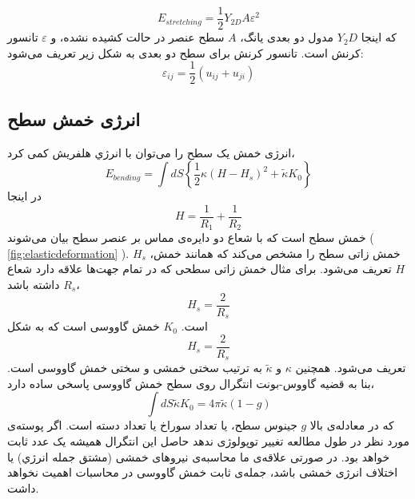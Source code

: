 \begin{equation}
E_{stretching}=\frac{1}{2}Y_{2D}A\varepsilon^2
\end{equation}
که اینجا 
$Y_2D$
مدول دو بعدی یانگ،
$A$
سطح عنصر در حالت کشیده نشده، و
$\varepsilon$
تانسور کرنش است. تانسور کرنش برای سطح دو بعدی به شکل زیر تعریف می‌شود:
\begin{equation}
\varepsilon_{ij} = \frac{1}{2}(u_{ij}+u_{ji})
\end{equation}

\subsection{
انرژی خمش سطح
}
انرژی خمش یک سطح را می‌توان با انرژي هلفریش
\cite{Helfrich1973}
 کمی کرد،
\begin{equation}
E_{bending}=\int dS\left\{\frac{1}{2}\kappa (H-H_s)^2 +\tilde \kappa K_0\right\}
\label{eq:helfrish}
\end{equation}
در اینجا
\begin{equation}
H = \frac{1}{R_1}+\frac{1}{R_2}
\end{equation}
خمش سطح است که با شعاع دو دایره‌ی مماس بر عنصر سطح بیان می‌شوند (
\ref{fig:elasticdeformation}
). 
$H_s$
خمش زاتی سطح را مشخص می‌کند که همانند خمش،
$H$
تعریف می‌شود. برای مثال خمش زاتی سطحی که در تمام جهت‌ها علاقه دارد شعاع 
$R_s$
داشته باشد، 
\begin{equation}
H_s = \frac{2}{R_s}
\end{equation}
است. 
$K_0$
خمش گاووسی است که به شکل 
\begin{equation}
H_s = \frac{2}{R_s}
\end{equation}
تعریف می‌شود. همچنین 
$\kappa$
و
$\tilde\kappa$
به ترتیب سختی خمشی و سختی خمش گاووسی است. بنا به قضیه گاووس-بونت
انتگرال روی سطح خمش گاووسی پاسخی ساده دارد،
\begin{equation}
\int dS \tilde \kappa K_0=4\pi\tilde\kappa(1-g)
\end{equation}
که در معادله‌ی بالا 
$g$
جینوس 
سطح، یا تعداد سوراخ یا تعداد دسته‌
است. اگر پوسته‌ی مورد نظر در طول مطالعه تغییر توپولوژی ندهد حاصل این انتگرال همیشه ‌یک عدد ثابت خواهد بود. در صورتی علاقه‌ی ما محاسبه‌ی نیرو‌های خمشی (مشتق جمله انرژي) یا اختلاف انرژی خمشی باشد، جمله‌ی ثابت خمش گاووسی در محاسبات اهمیت نخواهد داشت.
